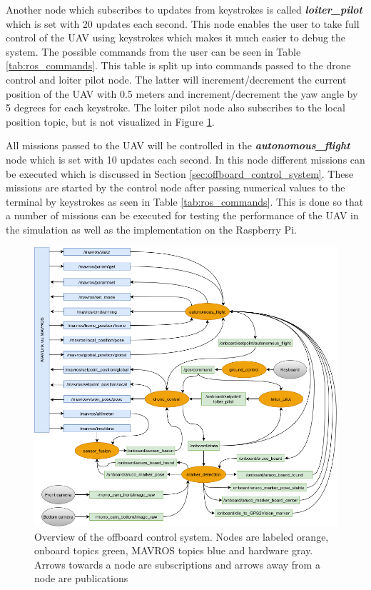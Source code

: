 \documentclass[../Head/report.tex]{subfiles}
\begin{document}
Another node which subscribes to updates from keystrokes is called  \textit{\textbf{loiter\_pilot}} which is set with 20 updates each second. This node enables the user to take full control of the UAV using keystrokes which makes it much easier to debug the system. The possible commands from the user can be seen in Table \ref{tab:ros_commands}. This table is split up into commands passed to the drone control and loiter pilot node. The latter will increment/decrement the current position of the UAV with 0.5 meters and increment/decrement the yaw angle by 5 degrees for each keystroke. The loiter pilot node also subscribes to the local position topic, but is not visualized in Figure \ref{fig:offboard_control}.

All missions passed to the UAV will be controlled in the \textit{\textbf{autonomous\_flight}} node which is set with 10 updates each second. In this node different missions can be executed which is discussed in Section \ref{sec:offboard_control_system}. These missions are started by the control node after passing numerical values to the terminal by keystrokes as seen in Table  \ref{tab:ros_commands}. This is done so that a number of missions can be executed for testing the performance of the UAV in the simulation as well as the implementation on the Raspberry Pi.

\begin{figure}[H]
    \centering
    \includegraphics[width=0.80\linewidth]{../Figures/node_communication.png}
    \caption{Overview of the offboard control system. Nodes are labeled orange, onboard topics green, MAVROS topics blue and hardware gray. Arrows towards a node are subscriptions and arrows away from a node are publications}
    \label{fig:offboard_control}
\end{figure}
\end{document}
